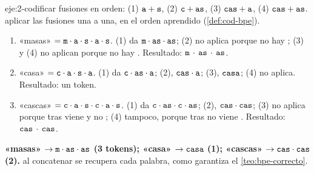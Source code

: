 \begin{solucion}{eje:2-codificar}
\datos fusiones en orden: (1) $\texttt{a}+\texttt{s}$, (2) $\texttt{c}+\texttt{as}$, (3) $\texttt{cas}+\texttt{a}$, (4) $\texttt{cas}+\texttt{as}$.
\planteamiento aplicar las fusiones una a una, en el orden aprendido (\cref{def:cod-bpe}).
\pasos
\begin{enumerate}[label=\arabic*.]
  \item «masas» $=\texttt{m}\cdot\texttt{a}\cdot\texttt{s}\cdot\texttt{a}\cdot\texttt{s}$. (1) da $\texttt{m}\cdot\texttt{as}\cdot\texttt{as}$; (2) no aplica porque no hay ; (3) y (4) no aplican porque no hay . Resultado: $\texttt{m}\,\cdot{}\,\texttt{as}\,\cdot{}\,\texttt{as}$.
  \item «casa» $=\texttt{c}\cdot\texttt{a}\cdot\texttt{s}\cdot\texttt{a}$. (1) da $\texttt{c}\cdot\texttt{as}\cdot\texttt{a}$; (2), $\texttt{cas}\cdot\texttt{a}$; (3), $\texttt{casa}$; (4) no aplica. Resultado: un token.
  \item «cascas» $=\texttt{c}\cdot\texttt{a}\cdot\texttt{s}\cdot\texttt{c}\cdot\texttt{a}\cdot\texttt{s}$. (1) da $\texttt{c}\cdot\texttt{as}\cdot\texttt{c}\cdot\texttt{as}$; (2), $\texttt{cas}\cdot\texttt{cas}$; (3) no aplica porque tras  viene  y no ; (4) tampoco, porque tras  no viene . Resultado: $\texttt{cas}\,\cdot{}\,\texttt{cas}$.
\end{enumerate}
\resultado \textbf{«masas» $\to\texttt{m}\cdot{}\texttt{as}\cdot{}\texttt{as}$ (3 tokens); «casa» $\to\texttt{casa}$ (1); «cascas» $\to\texttt{cas}\cdot{}\texttt{cas}$ (2).}
\comprobacion al concatenar se recupera cada palabra, como garantiza el \cref{teo:bpe-correcto}.
\end{solucion}

